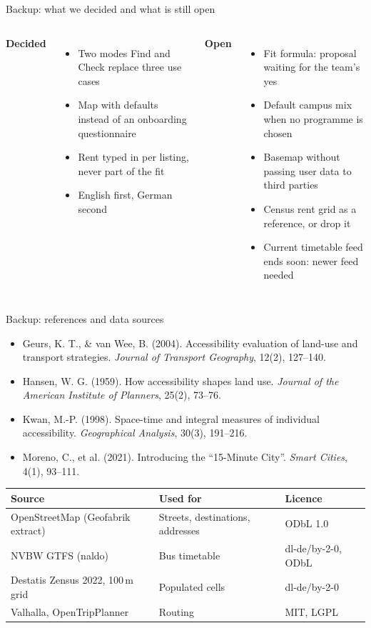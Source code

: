 \documentclass[aspectratio=169,10pt]{beamer}
\begin{document}
\begin{frame}{Backup: what we decided and what is still open}
  \begin{columns}[T,onlytextwidth]
      \textbf{Decided}
      \begin{itemize}\footnotesize
        \item Two modes Find and Check replace three use cases
        \item Map with defaults instead of an onboarding questionnaire
        \item Rent typed in per listing, never part of the fit
        \item English first, German second
      \end{itemize}
      \textbf{Open}
      \begin{itemize}\footnotesize
        \item Fit formula: proposal waiting for the team's yes
        \item Default campus mix when no programme is chosen
        \item Basemap without passing user data to third parties
        \item Census rent grid as a reference, or drop it
        \item Current timetable feed ends soon: newer feed needed
      \end{itemize}
  \end{columns}
\end{frame}

\begin{frame}{Backup: references and data sources}
  \footnotesize
  \begin{itemize}
    \item Geurs, K. T., \& van Wee, B. (2004). Accessibility evaluation of land-use and transport
          strategies. \emph{Journal of Transport Geography}, 12(2), 127--140.
    \item Hansen, W. G. (1959). How accessibility shapes land use. \emph{Journal of the American
          Institute of Planners}, 25(2), 73--76.
    \item Kwan, M.-P. (1998). Space-time and integral measures of individual accessibility.
          \emph{Geographical Analysis}, 30(3), 191--216.
    \item Moreno, C., et al. (2021). Introducing the ``15-Minute City''. \emph{Smart Cities},
          4(1), 93--111.
  \end{itemize}
  \medskip
  \begin{tabular}{@{}lll@{}}
    \toprule
    Source & Used for & Licence \\
    \midrule
    OpenStreetMap (Geofabrik extract) & Streets, destinations, addresses & ODbL 1.0 \\
    NVBW GTFS (naldo) & Bus timetable & dl-de/by-2-0, ODbL \\
    Destatis Zensus 2022, 100\,m grid & Populated cells & dl-de/by-2-0 \\
    Valhalla, OpenTripPlanner & Routing & MIT, LGPL \\
    \bottomrule
  \end{tabular}
\end{frame}
\end{document}
